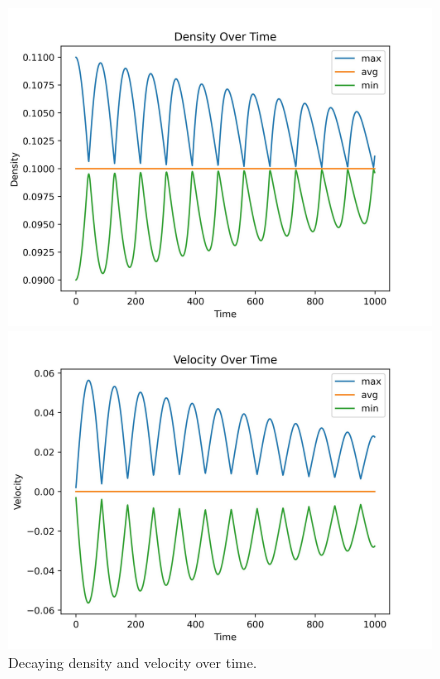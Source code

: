 \begin{center}
    \begin{figure}[h!]
        \begin{minipage}{0.5\textwidth}
            \includegraphics[width=\linewidth]{graphs/ShearWaveDecay/DensityDistribution/density_aggregate_over_time.jpg}
        \end{minipage}%
        \begin{minipage}{0.5\textwidth}
            \includegraphics[width=\linewidth]{graphs/ShearWaveDecay/DensityDistribution/velocity_aggregate_over_time.jpg}
        \end{minipage}
        \caption{Decaying density and velocity over time.}
        \label{fig:swd-decay}
    \end{figure}
\end{center}

